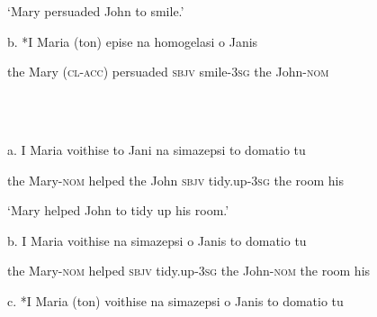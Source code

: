 \documentclass[output=paper]{langsci/langscibook}
\begin{document}
\begin{styleNurTexti}
    ‘Mary persuaded John to smile.’
\end{styleNurTexti}

\begin{styleNurTexti}
  b.  *I   Maria (ton)      epise        na     homogelasi   o    Janis
\end{styleNurTexti}

\begin{styleNurTexti}
    the Mary  (\textsc{cl-acc}) persuaded \textsc{sbjv} smile\textsc{{}-3sg}      the John\textsc{{}-nom}
\end{styleNurTexti}

\begin{styleNurTexti}
\ea%
    \label{ex:key:48}
    \gll\\
        \\
    \glt
    \z

          a.  I     Maria         voithise to    Jani   na   simazepsi   to   domatio tu
\end{styleNurTexti}

\begin{styleNurTexti}
    the Mary\textsc{{}-nom}  helped   the  John \textsc{sbjv} tidy.up\textsc{{}-3sg}  the room      his
\end{styleNurTexti}

\begin{styleNurTexti}
    ‘Mary helped John to tidy up his room.’
\end{styleNurTexti}

\begin{styleNurTexti}
    [F0B9?]
\end{styleNurTexti}

\begin{styleNurTexti}
  b.  I      Maria        voithise  na    simazepsi  o    Janis        to  domatio tu
\end{styleNurTexti}

\begin{styleNurTexti}
    the Mary\textsc{{}-nom}  helped    \textsc{sbjv} tidy.up\textsc{{}-3sg} the John\textsc{{}-nom} the room     his
\end{styleNurTexti}

\begin{styleNurTexti}
\end{styleNurTexti}

\begin{styleNurTexti}
  c.  *I Maria (ton) voithise na simazepsi  o    Janis        to  domatio tu
\end{styleNurTexti}
\end{document}
